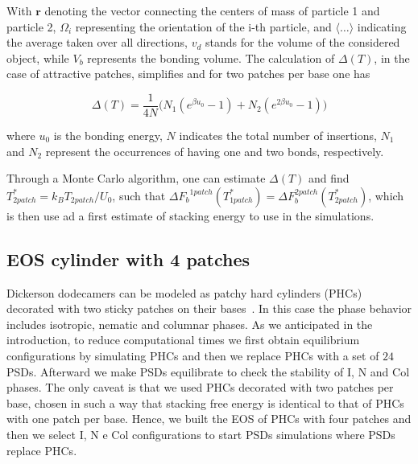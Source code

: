 \documentclass[aip,jcp, amsmath, amssymb, reprint]{revtex4-1}
\begin{document}
With $\textbf{r}$ denoting the vector connecting the centers of mass of particle 1 and particle 2, $\Omega_i$
representing the orientation of the i-th particle, and $\langle\ldots\rangle$ indicating the average taken over all
directions, $v_d$ stands for the volume of the considered object, while $V_b$ represents the bonding volume. The
calculation of $\Delta (T)$, in the case of attractive patches, simplifies and for two patches per base one has 

\begin{equation}
\label{deltat2}
	\Delta(T)=\frac{1}{4N}\big( N_1(e^{\beta u_0}-1)+N_2(e^{2\beta u_0}-1)\big)
\end{equation}

where $u_0$ is the bonding energy, $N$ indicates the total number of insertions, $N_1$ and $N_2$ represent the occurrences of having one and two
bonds, respectively. 

Through a Monte Carlo algorithm, one can estimate $\Delta(T)$
and find $T^*_{2 patch}=k_B T_{2 patch}/U_0$, such that ${\Delta F_b}^{1 patch}(T^*_{1 patch})=\Delta F_b^{2 patch}(T^*_{2 patch})$, 
which is then use ad a first estimate of stacking energy to use in the simulations.

\subsection{EOS cylinder with 4 patches}
Dickerson dodecamers can be modeled as patchy hard cylinders (PHCs) decorated with two sticky patches on their 
bases~\cite{DeMichele12}. In this case the phase behavior includes isotropic, nematic and columnar phases.
As we anticipated in the introduction, to reduce computational times we first obtain equilibrium configurations
by simulating PHCs and then we replace PHCs with a set of $24$ PSDs. Afterward we make PSDs equilibrate to check the stability
of I, N and Col phases. The only caveat is that we used PHCs decorated with two patches per base, chosen in such a way 
that stacking free energy is identical to that of PHCs with one patch per base. 
Hence, we built the EOS of PHCs with four patches and then we select I, N e Col configurations to start PSDs simulations
where PSDs replace PHCs.
\end{document}
